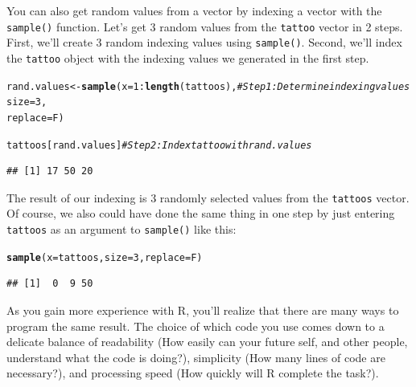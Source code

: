 \documentclass{tufte-book}\usepackage[]{graphicx}\usepackage[]{color}
\makeatletter
\newcommand{\hlnum}[1]{\textcolor[rgb]{0.686,0.059,0.569}{#1}}%
\newcommand{\hlcom}[1]{\textcolor[rgb]{0.678,0.584,0.686}{\textit{#1}}}%
\newcommand{\hlopt}[1]{\textcolor[rgb]{0,0,0}{#1}}%
\newcommand{\hlstd}[1]{\textcolor[rgb]{0.345,0.345,0.345}{#1}}%
\newcommand{\hlkwb}[1]{\textcolor[rgb]{0.69,0.353,0.396}{#1}}%
\newcommand{\hlkwc}[1]{\textcolor[rgb]{0.333,0.667,0.333}{#1}}%
\newcommand{\hlkwd}[1]{\textcolor[rgb]{0.737,0.353,0.396}{\textbf{#1}}}%
\newenvironment{kframe}{%
 \def\at@end@of@kframe{}%
 \ifinner\ifhmode%
  \def\at@end@of@kframe{\end{minipage}}%
  \begin{minipage}{\columnwidth}%
 \fi\fi%
 \def\FrameCommand##1{\hskip\@totalleftmargin \hskip-\fboxsep
 \colorbox{shadecolor}{##1}\hskip-\fboxsep
     \hskip-\linewidth \hskip-\@totalleftmargin \hskip\columnwidth}%
 \MakeFramed {\advance\hsize-\width
   \@totalleftmargin\z@ \linewidth\hsize
   \@setminipage}}%
 {\par\unskip\endMakeFramed%
 \at@end@of@kframe}
\newenvironment{knitrout}{}{} %
\makeatother
\begin{document}
\begin{marginfigure}
You can also get random values from a vector by indexing a vector with the \texttt{sample()} function. Let's get 3 random values from the \texttt{tattoo} vector in 2 steps. First, we'll create 3 random indexing values using \texttt{sample()}. Second, we'll index the \texttt{tattoo} object with the indexing values we generated in the first step.


\begin{knitrout}
\color{fgcolor}\begin{kframe}
\begin{alltt}
\hlstd{rand.values} \hlkwb{<-} \hlkwd{sample}\hlstd{(}\hlkwc{x} \hlstd{=} \hlnum{1}\hlopt{:}\hlkwd{length}\hlstd{(tattoos),}  \hlcom{# Step 1: Determine indexing values}
                      \hlkwc{size} \hlstd{=} \hlnum{3}\hlstd{,}
                      \hlkwc{replace} \hlstd{= F)}

\hlstd{tattoos[rand.values]} \hlcom{# Step 2: Index tattoo with rand.values}
\end{alltt}
\begin{verbatim}
## [1] 17 50 20
\end{verbatim}
\end{kframe}
\end{knitrout}


The result of our indexing is 3 randomly selected values from the \texttt{tattoos} vector. Of course, we also could have done the same thing in one step by just entering \texttt{tattoos} as an argument to \texttt{sample()} like this:


\begin{knitrout}
\color{fgcolor}\begin{kframe}
\begin{alltt}
\hlkwd{sample}\hlstd{(}\hlkwc{x} \hlstd{= tattoos,} \hlkwc{size} \hlstd{=} \hlnum{3}\hlstd{,} \hlkwc{replace} \hlstd{= F)}
\end{alltt}
\begin{verbatim}
## [1]  0  9 50
\end{verbatim}
\end{kframe}
\end{knitrout}

\end{marginfigure}

As you gain more experience with R, you'll realize that there are many ways to program the same result. The choice of which code you use comes down to a delicate balance of readability (How easily can your future self, and other people, understand what the code is doing?), simplicity (How many lines of code are necessary?), and processing speed (How quickly will R complete the task?).
\end{document}

